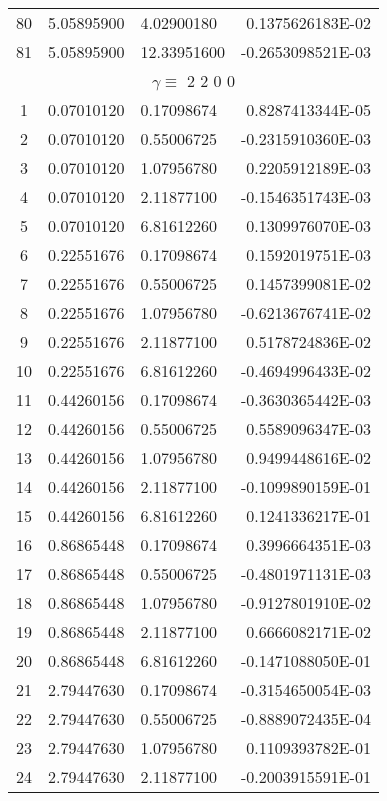 \begin{longtable}{@{\extracolsep{\fill}}cllr@{}}
80  &  5.05895900  &  4.02900180  &   0.1375626183E-02 \\
81  &  5.05895900  &  12.33951600  &  -0.2653098521E-03 \\
\midrule
\multicolumn{4}{c}{ $\gamma \equiv $  2 2 0 0} \\
\midrule
1  &  0.07010120  &  0.17098674  &   0.8287413344E-05 \\
2  &  0.07010120  &  0.55006725  &  -0.2315910360E-03 \\
3  &  0.07010120  &  1.07956780  &   0.2205912189E-03 \\
4  &  0.07010120  &  2.11877100  &  -0.1546351743E-03 \\
5  &  0.07010120  &  6.81612260  &   0.1309976070E-03 \\
6  &  0.22551676  &  0.17098674  &   0.1592019751E-03 \\
7  &  0.22551676  &  0.55006725  &   0.1457399081E-02 \\
8  &  0.22551676  &  1.07956780  &  -0.6213676741E-02 \\
9  &  0.22551676  &  2.11877100  &   0.5178724836E-02 \\
10  &  0.22551676  &  6.81612260  &  -0.4694996433E-02 \\
11  &  0.44260156  &  0.17098674  &  -0.3630365442E-03 \\
12  &  0.44260156  &  0.55006725  &   0.5589096347E-03 \\
13  &  0.44260156  &  1.07956780  &   0.9499448616E-02 \\
14  &  0.44260156  &  2.11877100  &  -0.1099890159E-01 \\
15  &  0.44260156  &  6.81612260  &   0.1241336217E-01 \\
16  &  0.86865448  &  0.17098674  &   0.3996664351E-03 \\
17  &  0.86865448  &  0.55006725  &  -0.4801971131E-03 \\
18  &  0.86865448  &  1.07956780  &  -0.9127801910E-02 \\
19  &  0.86865448  &  2.11877100  &   0.6666082171E-02 \\
20  &  0.86865448  &  6.81612260  &  -0.1471088050E-01 \\
21  &  2.79447630  &  0.17098674  &  -0.3154650054E-03 \\
22  &  2.79447630  &  0.55006725  &  -0.8889072435E-04 \\
23  &  2.79447630  &  1.07956780  &   0.1109393782E-01 \\
24  &  2.79447630  &  2.11877100  &  -0.2003915591E-01 \\

\end{longtable}
